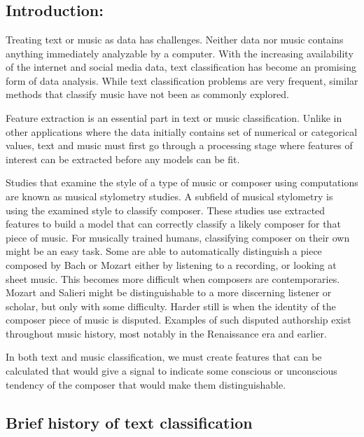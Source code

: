 \documentclass[12pt,twoside]{reedthesis}
\theoremstyle{definition}
\theoremstyle{definition}
\theoremstyle{definition}
\theoremstyle{remark}
\begin{document}
\chapter{}\label{section}

\section{Introduction:}\label{introduction}

Treating text or music as data has challenges. Neither data nor music
contains anything immediately analyzable by a computer. With the
increasing availability of the internet and social media data, text
classification has become an promising form of data analysis. While text
classification problems are very frequent, similar methods that classify
music have not been as commonly explored.

Feature extraction is an essential part in text or music classification.
Unlike in other applications where the data initially contains set of
numerical or categorical values, text and music must first go through a
processing stage where features of interest can be extracted before any
models can be fit.

Studies that examine the style of a type of music or composer using
computations are known as musical stylometry studies. A subfield of
musical stylometry is using the examined style to classify composer.
These studies use extracted features to build a model that can correctly
classify a likely composer for that piece of music. For musically
trained humans, classifying composer on their own might be an easy task.
Some are able to automatically distinguish a piece composed by Bach or
Mozart either by listening to a recording, or looking at sheet music.
This becomes more difficult when composers are contemporaries. Mozart
and Salieri might be distinguishable to a more discerning listener or
scholar, but only with some difficulty. Harder still is when the
identity of the composer piece of music is disputed. Examples of such
disputed authorship exist throughout music history, most notably in the
Renaissance era and earlier.

In both text and music classification, we must create features that can
be calculated that would give a signal to indicate some conscious or
unconscious tendency of the composer that would make them
distinguishable.

\section{Brief history of text
classification}\label{brief-history-of-text-classification}
\end{document}
